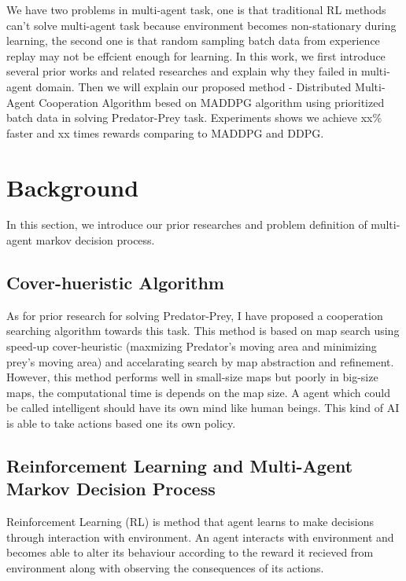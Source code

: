 \documentclass[11pt,twocolumn]{jarticle} %
\begin{document}
We have two problems in multi-agent task, one is that traditional RL methods can't solve multi-agent task because environment becomes non-stationary during learning, the second one is that random sampling batch data from experience replay may not be effcient enough for learning. In this work, we first introduce several prior works and related researches and explain why they failed in multi-agent domain. Then we will explain our proposed method - Distributed Multi-Agent Cooperation Algorithm besed on MADDPG algorithm\cite{maddpg} using prioritized batch data in solving Predator-Prey task. Experiments shows we achieve xx\% faster and xx times rewards comparing to MADDPG and DDPG.\par

\section{Background} 
In this section, we introduce our prior researches and problem definition of multi-agent markov decision process.
\subsection{Cover-hueristic Algorithm\cite{cover}}
As for prior research for solving Predator-Prey, I have proposed a cooperation searching algorithm towards this task. This method is based on map search using speed-up cover-heuristic \cite{cover-heuristic} (maxmizing Predator's moving area and minimizing prey's moving area) and accelarating search by map abstraction and refinement. However, this method performs well in small-size maps but poorly in big-size maps, the computational time is depends on the map size. A agent which could be called intelligent should have its own mind like human beings. This kind of AI is able to take actions based one its own policy.\par


\subsection{Reinforcement Learning and Multi-Agent Markov Decision Process}

Reinforcement Learning (RL) is method that agent learns to make decisions through interaction with environment. An agent interacts with environment and becomes able to alter its behaviour according to the reward it recieved from environment along with observing the consequences of its actions. \par
\end{document}
